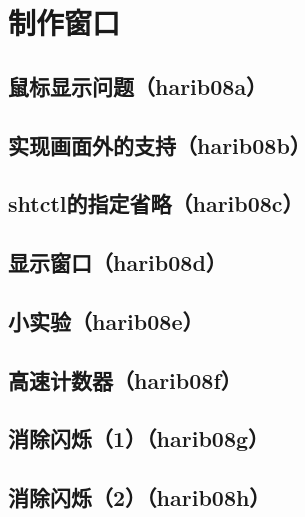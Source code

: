 ﻿\chapter{	制作窗口	}
\section{	鼠标显示问题（harib08a）	}
\section{	实现画面外的支持（harib08b）	}
\section{	shtctl的指定省略（harib08c）	}
\section{	显示窗口（harib08d）	}
\section{	小实验（harib08e）	}
\section{	高速计数器（harib08f）	}
\section{	消除闪烁（1）（harib08g）	}
\section{	消除闪烁（2）（harib08h）	}


